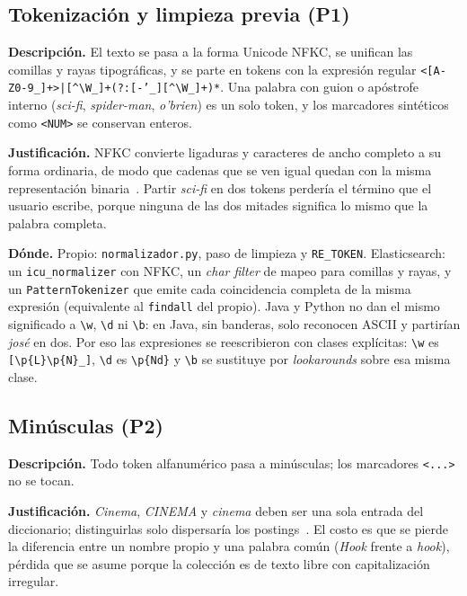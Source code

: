 \documentclass[11pt,spanish]{article}
\begin{document}
\subsection{Tokenización y limpieza previa (P1)}
\textbf{Descripción.} El texto se pasa a la forma Unicode NFKC, se unifican las comillas y rayas tipográficas, y se parte en tokens con la expresión regular \texttt{<[A-Z0-9\_]+>|[\textasciicircum\textbackslash W\_]+(?:[-'\_][\textasciicircum\textbackslash W\_]+)*}. Una palabra con guion o apóstrofe interno (\textit{sci-fi}, \textit{spider-man}, \textit{o'brien}) es un solo token, y los marcadores sintéticos como \texttt{<NUM>} se conservan enteros.

\textbf{Justificación.} NFKC convierte ligaduras y caracteres de ancho completo a su forma ordinaria, de modo que cadenas que se ven igual quedan con la misma representación binaria~\cite{unicode15}. Partir \textit{sci-fi} en dos tokens perdería el término que el usuario escribe, porque ninguna de las dos mitades significa lo mismo que la palabra completa.

\textbf{Dónde.} Propio: \texttt{normalizador.py}, paso de limpieza y \texttt{RE\_TOKEN}. Elasticsearch: un \texttt{icu\_normalizer} con NFKC, un \emph{char filter} de mapeo para comillas y rayas, y un \texttt{PatternTokenizer} que emite cada coincidencia completa de la misma expresión (equivalente al \texttt{findall} del propio). Java y Python no dan el mismo significado a \texttt{\textbackslash w}, \texttt{\textbackslash d} ni \texttt{\textbackslash b}: en Java, sin banderas, solo reconocen ASCII y partirían \textit{josé} en dos. Por eso las expresiones se reescribieron con clases explícitas: \texttt{\textbackslash w} es \texttt{[\textbackslash p\{L\}\textbackslash p\{N\}\_]}, \texttt{\textbackslash d} es \texttt{\textbackslash p\{Nd\}} y \texttt{\textbackslash b} se sustituye por \emph{lookarounds} sobre esa misma clase.

\subsection{Minúsculas (P2)}
\textbf{Descripción.} Todo token alfanumérico pasa a minúsculas; los marcadores \texttt{<...>} no se tocan.

\textbf{Justificación.} \textit{Cinema}, \textit{CINEMA} y \textit{cinema} deben ser una sola entrada del diccionario; distinguirlas solo dispersaría los postings~\cite{manning2008}. El costo es que se pierde la diferencia entre un nombre propio y una palabra común (\textit{Hook} frente a \textit{hook}), pérdida que se asume porque la colección es de texto libre con capitalización irregular.
\end{document}
